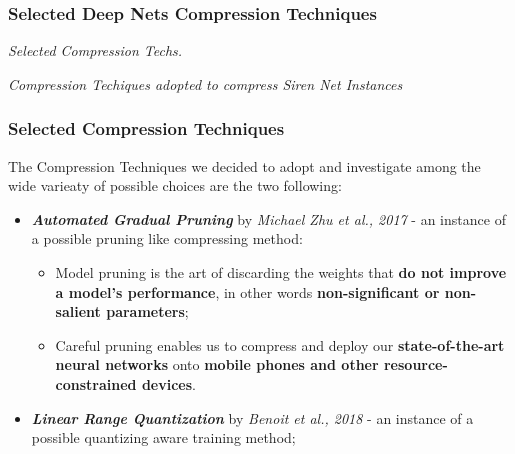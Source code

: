 

\begin{frame}
    \frametitle{Selected Deep Nets Compression Techniques}
        \begin{center}
            {\fontsize{40}{50}\selectfont \emph{Selected Compression Techs.}}
        \end{center}
        \begin{center}
            {\emph{Compression Techiques adopted to compress Siren Net Instances}}
        \end{center}
\end{frame}

\begin{frame}
    \frametitle{Selected Compression Techniques}
        The Compression Techniques we decided to adopt and investigate among the wide varieaty of possible choices are the two following:
        \begin{itemize}
        \item \textbf{\textit{Automated Gradual Pruning}} by \textit{Michael Zhu et al., 2017} - an instance of a possible pruning like compressing method:
        \begin{itemize}
        \item Model pruning is the art of discarding the weights that \textbf{do not improve a model's performance},
            in other words \textbf{non-significant or non-salient parameters};
        \item Careful pruning enables us to compress and deploy our \textbf{state-of-the-art neural networks}
            onto \textbf{mobile phones and other resource-constrained devices}.
        \end{itemize}
        \item \textbf{\textit{Linear Range Quantization}} by \textit{ Benoit et al., 2018} - an instance of a possible quantizing aware training method;
        \end{itemize}
\end{frame}
